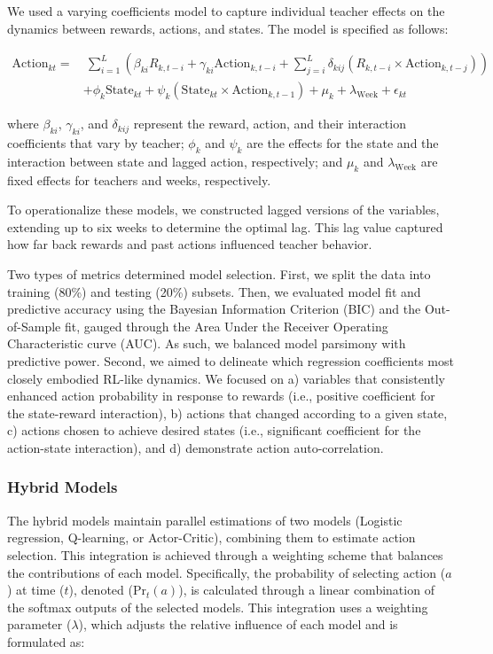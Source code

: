 \documentclass[
  number,
  preprint,
  3p,
  onecolumn]{elsarticle}
\begin{document}
We used a varying coefficients model to capture individual teacher
effects on the dynamics between rewards, actions, and states. The model
is specified as follows:

\begin{align*}
\text{Action}_{kt} =& \ \sum_{i=1}^{L} \left( \beta_{ki} R_{k, t-i} + \gamma_{ki} \text{Action}_{k, t-i} + \sum_{j=i}^{L} \delta_{kij} (R_{k, t-i} \times \text{Action}_{k, t-j}) \right) \\
& + \phi_k \text{State}_{kt} + \psi_k (\text{State}_{kt} \times \text{Action}_{k, t-1}) + \mu_k + \lambda_{\text{Week}} + \epsilon_{kt}
\end{align*}

where \(\beta_{ki}\), \(\gamma_{ki}\), and \(\delta_{kij}\) represent
the reward, action, and their interaction coefficients that vary by
teacher; \(\phi_k\) and \(\psi_k\) are the effects for the state and the
interaction between state and lagged action, respectively; and \(\mu_k\)
and \(\lambda_{\text{Week}}\) are fixed effects for teachers and weeks,
respectively.

To operationalize these models, we constructed lagged versions of the
variables, extending up to six weeks to determine the optimal lag. This
lag value captured how far back rewards and past actions influenced
teacher behavior.

Two types of metrics determined model selection. First, we split the
data into training (80\%) and testing (20\%) subsets. Then, we evaluated
model fit and predictive accuracy using the Bayesian Information
Criterion (BIC) and the Out-of-Sample fit, gauged through the Area Under
the Receiver Operating Characteristic curve (AUC). As such, we balanced
model parsimony with predictive power. Second, we aimed to delineate
which regression coefficients most closely embodied RL-like dynamics. We
focused on a) variables that consistently enhanced action probability in
response to rewards (i.e., positive coefficient for the state-reward
interaction), b) actions that changed according to a given state, c)
actions chosen to achieve desired states (i.e., significant coefficient
for the action-state interaction), and d) demonstrate action
auto-correlation.

\subsubsection{Hybrid Models}\label{hybrid-models}

The hybrid models maintain parallel estimations of two models (Logistic
regression, Q-learning, or Actor-Critic), combining them to estimate
action selection. This integration is achieved through a weighting
scheme that balances the contributions of each model. Specifically, the
probability of selecting action (\(a\)) at time (\(t\)), denoted
(\(\text{Pr}_t(a)\)), is calculated through a linear combination of the
softmax outputs of the selected models. This integration uses a
weighting parameter (\(\lambda\)), which adjusts the relative influence
of each model and is formulated as:
\end{document}
